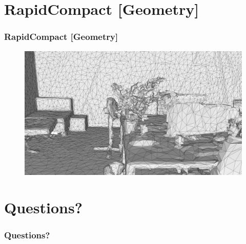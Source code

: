 \documentclass[
	10pt,
	t		%
]{beamer}
\begin{document}
\section{RapidCompact [Geometry]}
\begin{frame}
\frametitle{RapidCompact [Geometry]}
\begin{figure}[ht]
\centering
\includegraphics[width=1\textwidth]{rapid_compact}
\end{figure}
\end{frame}

\section{Questions?}
\begin{frame}
\frametitle{Questions?}
\end{frame}
\end{document}
